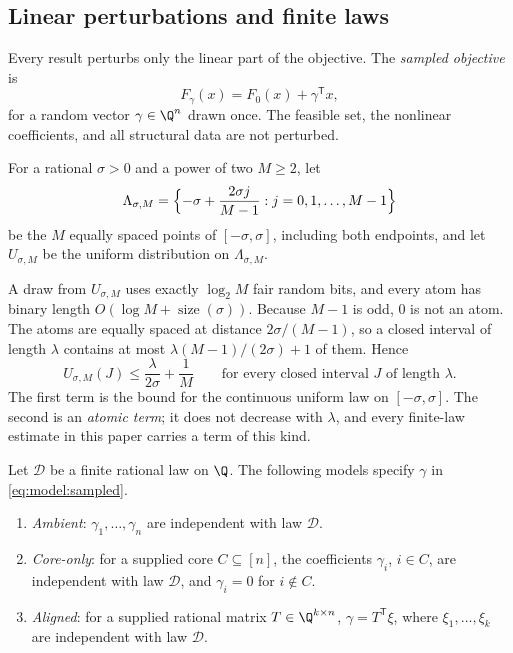 \subsection{Linear perturbations and finite laws}\label{sec:model:noise}

Every result perturbs only the linear part of the objective. The
\emph{sampled objective} is
\begin{equation}\label{eq:model:sampled}
 F_\gamma(x)=F_0(x)+\gamma^{\mathsf T}x,
\end{equation}
for a random vector $\gamma\in\Q^n$ drawn once. The feasible set, the
nonlinear coefficients, and all structural data are not perturbed.

\begin{definition}\label{def:model:grid}
For a rational $\sigma>0$ and a power of two $M\ge2$, let
\[
 \Lambda_{\sigma,M}=\Bigl\{-\sigma+\frac{2\sigma j}{M-1}:j=0,1,\ldots,M-1\Bigr\}
\]
be the $M$ equally spaced points of $[-\sigma,\sigma]$, including both
endpoints, and let $U_{\sigma,M}$ be the uniform distribution on
$\Lambda_{\sigma,M}$.
\end{definition}

A draw from $U_{\sigma,M}$ uses exactly $\log_2M$ fair random bits, and every
atom has binary length $O(\log M+\operatorname{size}(\sigma))$. Because $M-1$
is odd, $0$ is not an atom. The atoms are equally spaced at distance
$2\sigma/(M-1)$, so a closed interval of length $\lambda$ contains at most
$\lambda(M-1)/(2\sigma)+1$ of them. Hence
\begin{equation}\label{eq:model:interval}
 U_{\sigma,M}(J)\le\frac{\lambda}{2\sigma}+\frac1M
 \qquad\text{for every closed interval $J$ of length $\lambda$.}
\end{equation}
The first term is the bound for the continuous uniform law on
$[-\sigma,\sigma]$. The second is an \emph{atomic term}; it does not
decrease with $\lambda$, and every finite-law estimate in this paper carries
a term of this kind.

\begin{definition}\label{def:model:perturbation}
Let $\mathcal D$ be a finite rational law on $\Q$. The following models
specify $\gamma$ in \eqref{eq:model:sampled}.
\begin{enumerate}[label=(\roman*)]
\item \emph{Ambient}: $\gamma_1,\ldots,\gamma_n$ are independent with law
$\mathcal D$.
\item \emph{Core-only}: for a supplied core $C\subseteq[n]$, the coefficients
$\gamma_i$, $i\in C$, are independent with law $\mathcal D$, and
$\gamma_i=0$ for $i\notin C$.
\item \emph{Aligned}: for a supplied rational matrix $T\in\Q^{k\times n}$,
$\gamma=T^{\mathsf T}\xi$, where $\xi_1,\ldots,\xi_k$ are independent with
law $\mathcal D$.
\end{enumerate}
\end{definition}

